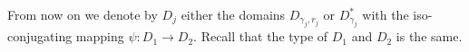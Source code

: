 \documentclass[a4paper,12pt]{amsart}
\newtheorem{lemma}[theorem]{Lemma}
\theoremstyle{definition}
\begin{document}



From now on we denote by $D_j$ either the domains $D_{\gamma_j,r_j}$ or $D_{\gamma_j}^*$ with the iso-conjugating mapping $\psi \colon D_1\to D_2$. Recall that the type of $D_1$ and $D_2$ is the same.
\end{document}
